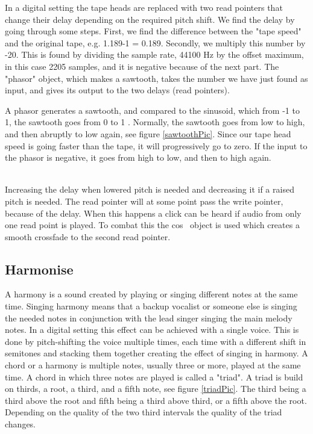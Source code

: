 In a digital setting the tape heads are replaced with two read pointers that change their delay depending on the required pitch shift. 
We find the delay by going through some steps. First, we find the difference between the "tape speed" and the original tape, e.g. 1.189-1 = 0.189. 
Secondly, we multiply this number by -20. This is found by dividing the sample rate, 44100 Hz by the offset maximum, in this case 2205 samples,
and it is negative because of the next part. The "phasor" object, which makes a sawtooth, takes the number we have just found as input, and gives its output to the two delays (read pointers). 

A phasor generates a sawtooth, and compared to the sinusoid, which from -1 to 1, the sawtooth goes from 0 to 1 \citep{FlossManuals}. Normally, the sawtooth goes from low to high, and then abruptly to low again, see figure \ref{sawtoothPic}. Since our tape head speed is going faster than the tape, it will progressively go to zero. If the input to the phasor is negative, it goes from high to low, and then to high again.   

\begin{minipage}{\linewidth}%
\label{sawtoothPic}
\end{minipage}\\



Increasing the delay when lowered pitch is needed and decreasing it if a raised pitch is needed. 
The read pointer will at some point pass the write pointer, because of the delay. When this happens a click can be heard if audio from only one read point is played. To combat this the cos~ object is used which creates a smooth crossfade to the second read pointer.

\subsection{Harmonise}

A harmony is a sound created by playing or singing different notes at the same time\citep{Harmonise02}.
Singing harmony means that a backup vocalist or someone else is singing the needed notes in conjunction with the lead singer singing the main melody notes. In a digital setting this effect can be achieved with a single voice. This is done by pitch-shifting the voice multiple times, each time with a different shift in semitones and stacking them together creating the effect of singing in harmony. 
A chord or a harmony is multiple notes, usually three or more, played at the same time. A chord in which three notes are played is called a "triad"\citep{Harmonise01}. A triad is build on thirds, a root, a third, and a fifth note, see figure \ref{triadPic}. The third being a third above the root and fifth being a third above third, or a fifth above the root. Depending on the quality of the two third intervals the quality of the triad changes. \\

